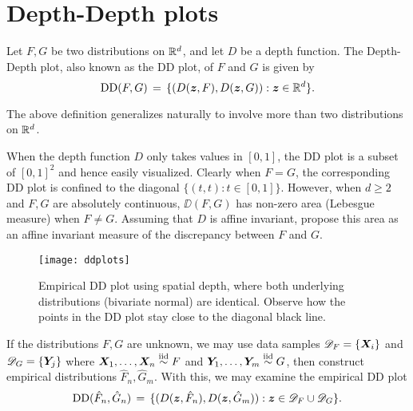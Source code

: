 \section{Depth-Depth plots}
\label{sec:multivariate_ddplots}

\begin{definition}[DD plot] \label{def:ddplot}
    Let $F, G$ be two distributions on $\mathbb{R}^d$, and let $D$ be a depth
    function. The Depth-Depth plot, also known as the DD plot, of $F$ and $G$
    is given by
    \begin{equation}
        \operatorname{DD}(F, G) \,=\, \{(D(\bm{z}, F), D(\bm{z}, G)) : \bm{z} \in \mathbb{R}^d\}.
    \end{equation}
\end{definition}
\begin{remark}
    The above definition generalizes naturally to involve more than two
    distributions on $\mathbb{R}^d$.
\end{remark}

When the depth function $D$ only takes values in $[0, 1]$, the DD plot is a
subset of $[0, 1]^2$ and hence easily visualized.
Clearly when $F = G$, the corresponding DD plot is confined to the diagonal
$\{(t, t) : t \in [0, 1]\}$.
However, when $d \geq 2$ and $F, G$ are absolutely continuous, $\DD(F, G)$ has
non-zero area (Lebesgue measure) when $F \neq G$.
Assuming that $D$ is affine invariant, \textcite{liu-parelius-singh-1999}
propose this area as an affine invariant measure of the discrepancy between
$F$ and $G$.



\begin{figure}
    \centering
    \texttt{[image: ddplots]}
    \caption{
        Empirical DD plot using spatial depth, where both underlying
        distributions (bivariate normal) are identical.
        Observe how the points in the DD plot stay close to the diagonal black
        line.
    }
    \label{fig:ddplots_identical}
\end{figure}



If the distributions $F, G$ are unknown, we may use data samples
$\mathscr{D}_F = \{\bm{X}_i\}$ and $\mathscr{D}_G = \{\bm{Y}_j\}$ where $\bm{X}_1,
\dots, \bm{X}_n \overset{\text{iid}}{\sim} F$ and $\bm{Y}_1, \dots, \bm{Y}_m \overset{\text{iid}}{\sim} G$, then construct
empirical distributions $\hat{F}_n, \hat{G}_m$.
With this, we may examine the empirical DD plot
\begin{equation}
    \operatorname{DD}(\hat{F}_n, \hat{G}_n) \,=\, \{(D(\bm{z}, \hat{F}_n), D(\bm{z}, \hat{G}_m)) : \bm{z} \in \mathscr{D}_F \cup \mathscr{D}_G\}.
\end{equation}

